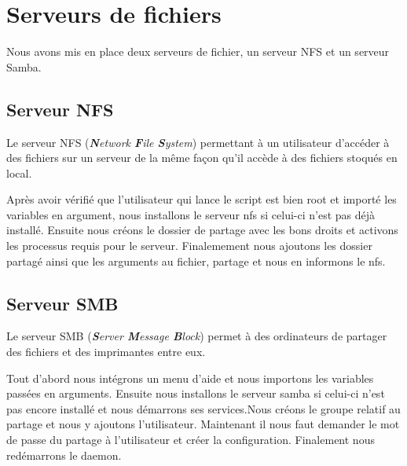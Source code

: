 \section{Serveurs de fichiers}
Nous avons mis en place deux serveurs de fichier, un serveur NFS et un serveur Samba. 
\subsection{Serveur NFS}
Le serveur NFS (\textit{\textbf{N}etwork \textbf{F}ile \textbf{S}ystem}) permettant à un utilisateur d'accéder à des fichiers sur un serveur de la même façon qu'il accède à des fichiers stoqués en local.



Après avoir vérifié que l'utilisateur qui lance le script est bien root et importé les variables en argument, nous installons le serveur nfs si celui-ci n'est pas déjà installé. Ensuite nous créons le dossier de partage avec les bons droits et activons les processus requis pour le serveur. Finalemement nous ajoutons les dossier partagé ainsi que les arguments au fichier, partage et nous en informons le nfs.

\subsection{Serveur SMB}
Le serveur SMB (\textit{\textbf{S}erver \textbf{M}essage \textbf{B}lock}) permet à des ordinateurs de partager des fichiers et des imprimantes entre eux.



Tout d'abord nous intégrons un menu d'aide et nous importons les variables passées en arguments. Ensuite nous installons le serveur samba si celui-ci n'est pas encore installé et nous démarrons ses services.Nous créons le groupe relatif au partage et nous y ajoutons l'utilisateur. Maintenant il nous faut demander le mot de passe du partage à l'utilisateur et créer la configuration. Finalement nous redémarrons le daemon.
